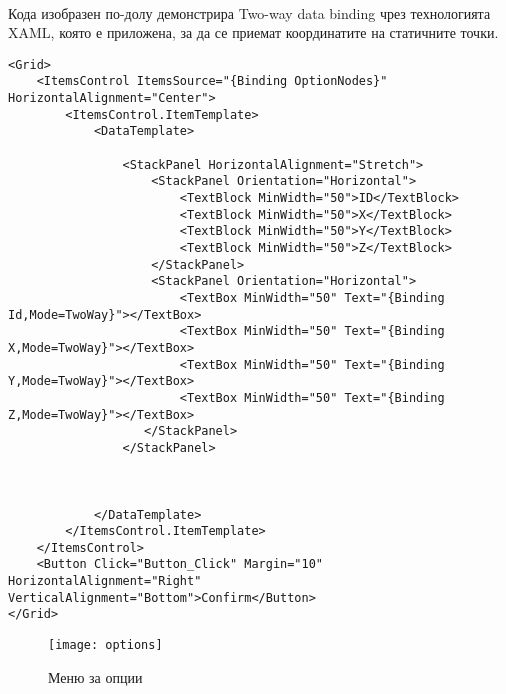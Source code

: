 \\

Кода изобразен по-долу демонстрира Two-way data binding чрез технологията XAML, която е приложена, за да се приемат координатите на статичните точки.

\begin{lstlisting}
<Grid>
    <ItemsControl ItemsSource="{Binding OptionNodes}" HorizontalAlignment="Center">
        <ItemsControl.ItemTemplate>
            <DataTemplate>

                <StackPanel HorizontalAlignment="Stretch">
                    <StackPanel Orientation="Horizontal">
                        <TextBlock MinWidth="50">ID</TextBlock>
                        <TextBlock MinWidth="50">X</TextBlock>
                        <TextBlock MinWidth="50">Y</TextBlock>
                        <TextBlock MinWidth="50">Z</TextBlock>
                    </StackPanel>   
                    <StackPanel Orientation="Horizontal">
                        <TextBox MinWidth="50" Text="{Binding Id,Mode=TwoWay}"></TextBox>
                        <TextBox MinWidth="50" Text="{Binding X,Mode=TwoWay}"></TextBox>
                        <TextBox MinWidth="50" Text="{Binding Y,Mode=TwoWay}"></TextBox>
                        <TextBox MinWidth="50" Text="{Binding Z,Mode=TwoWay}"></TextBox>
                   </StackPanel>
                </StackPanel>
                

                
            </DataTemplate>
        </ItemsControl.ItemTemplate>
    </ItemsControl>
    <Button Click="Button_Click" Margin="10"  HorizontalAlignment="Right" VerticalAlignment="Bottom">Confirm</Button>
</Grid>
\end{lstlisting}

\begin{figure}
   \centerline{\texttt{[image: options]}}
    \caption{Меню за опции}
    \label{fig:options}
\end{figure}

\pagebreak

